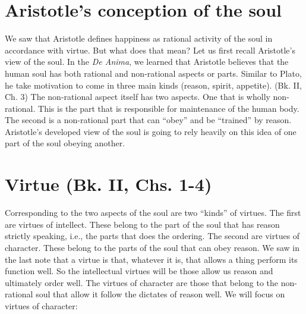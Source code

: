 \documentclass[oneside]{article}
\begin{document}
\thispagestyle{fancy}

\section*{Aristotle's conception of the soul}
We saw that Aristotle defines happiness as rational activity of the soul in accordance with virtue. But what does that mean? Let us first recall Aristotle's view of the soul. In the \emph{De Anima}, we learned that Aristotle believes that the human soul has both rational and non-rational aspects or parts. Similar to Plato, he take motivation to come in three main kinds (reason, spirit, appetite).  (Bk. II, Ch. 3)
The non-rational aspect itself has two aspects. One that is wholly non-rational. This is the part that is responsible for maintenance of the human body. The second is a non-rational part that can ``obey'' and be ``trained'' by reason. Aristotle's developed view of the soul is going to rely heavily on this idea of one part of the soul obeying another. 

\section*{Virtue (Bk. II, Chs. 1-4)}

Corresponding to the two aspects of the soul are two ``kinds'' of virtues. The first are virtues of intellect. These belong to the part of the soul that has reason strictly speaking, i.e., the parts that does the ordering. The second are virtues of character. These belong to the parts of the soul that can obey reason. We saw in the last note that a virtue is that, whatever it is, that allows a thing perform its function well. So the intellectual virtues will be those allow us reason and ultimately order well. The virtues of character are those that belong to the non-rational soul that allow it follow the dictates of reason well.  We will focus on virtues of character: 
\end{document}
